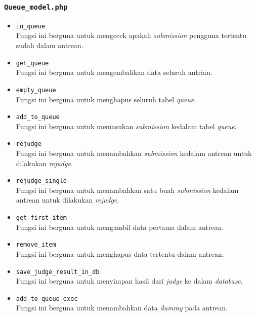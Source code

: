 \subsubsection{\texttt{Queue\_model.php}}
\begin{itemize}
	\item \texttt{in\_queue}\\
	Fungsi ini berguna untuk mengecek apakah \textit{submission} pengguna tertentu sudah dalam antrean.
	\item \texttt{get\_queue}\\
	Fungsi ini berguna untuk mengembalikan data seluruh antrian.
	\item \texttt{empty\_queue}\\
	Fungsi ini berguna untuk menghapus seluruh tabel \textit{queue}.
	\item \texttt{add\_to\_queue}\\
	Fungsi ini berguna untuk memasukan \textit{submission} kedalam tabel \textit{queue}.
	\item \texttt{rejudge}\\
	Fungsi ini berguna untuk menambahkan \textit{submission} kedalam antrean untuk dilakukan \textit{rejudge}.
	\item \texttt{rejudge\_single}\\
	Fungsi ini berguna untuk menambahkan satu buah \textit{submission} kedalam antrean untuk dilakukan \textit{rejudge}.
	\item \texttt{get\_first\_item}\\
	Fungsi ini berguna untuk mengambil data pertama dalam antrean.
	\item \texttt{remove\_item}\\
	Fungsi ini berguna untuk menghapus data tertentu dalam antrean.
	\item \texttt{save\_judge\_result\_in\_db}\\
	Fungsi ini berguna untuk menyimpan hasil dari \textit{judge} ke dalam \textit{database}.
	\item \texttt{add\_to\_queue\_exec}\\
	Fungsi ini berguna untuk menambahkan data \textit{dummy} pada antrean.
\end{itemize}
